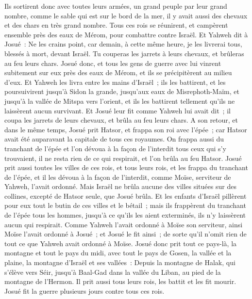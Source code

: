 \begin{multicols}{2}
Ils sortirent donc avec toutes leurs armées, un grand peuple par leur grand nombre, comme le sable qui est sur le bord de la mer, il y avait aussi des chevaux et des chars en très grand nombre.
Tous ces rois se réunirent, et campèrent ensemble près des eaux de Mérom, pour combattre contre Israël.
Et Yahweh dit à Josué~: Ne les crains point, car demain, à cette même heure, je les livrerai tous, blessés à mort, devant Israël. Tu couperas les jarrets à leurs chevaux, et brûleras au feu leurs chars.
Josué donc, et tous les gens de guerre avec lui vinrent subitement sur eux près des eaux de Mérom, et ils se précipitèrent au milieu d'eux.
Et Yahweh les livra entre les mains d'Israël~; ils les battirent, et les poursuivirent jusqu'à Sidon la grande, jusqu'aux eaux de Misrephoth-Maïm, et jusqu'à la vallée de Mitspa vers l'orient, et ils les battirent tellement qu'ils ne laissèrent aucun survivant.
Et Josué leur fit comme Yahweh lui avait dit~; il coupa les jarrets de leurs chevaux, et brûla au feu leurs chars.
A son retour, et dans le même temps, Josué prit Hatsor, et frappa son roi avec l'épée~; car Hatsor avait été auparavant la capitale de tous ces royaumes.
On frappa aussi du tranchant de l'épée et l'on dévoua à la façon de l'interdit tous ceux qui s'y trouvaient, il ne resta rien de ce qui respirait, et l'on brûla au feu Hatsor.
Josué prit aussi toutes les villes de ces rois, et tous leurs rois, et les frappa du tranchant de l'épée, et il les dévoua à la façon de l'interdit, comme Moïse, serviteur de Yahweh, l'avait ordonné.
Mais Israël ne brûla aucune des villes situées sur des collines, excepté de Hatsor seule, que Josué brûla.
Et les enfants d'Israël pillèrent pour eux tout le butin de ces villes et le bétail~; mais ils frappèrent du tranchant de l'épée tous les hommes, jusqu'à ce qu'ils les aient exterminés, ils n'y laissèrent aucun qui respirait.
Comme Yahweh l'avait ordonné à Moïse son serviteur, ainsi Moïse l'avait ordonné à Josué~; et Josué le fit ainsi~; de sorte qu'il n'omit rien de tout ce que Yahweh avait ordonné à Moïse.
Josué donc prit tout ce pays-là, la montagne et tout le pays du midi, avec tout le pays de Gosen, la vallée et la plaine, la montagne d'Israël et ses vallées~:
Depuis la montagne de Halak, qui s'élève vers Séir, jusqu'à Baal-Gad dans la vallée du Liban, au pied de la montagne de l'Hermon. Il prit aussi tous leurs rois, les battit et les fit mourir.
 Josué fit la guerre plusieurs jours contre tous ces rois.

\end{multicols}
